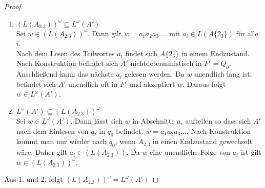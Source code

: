 \documentclass[a4paper]{scrartcl}
\begin{document}
\begin{enumerate}
\begin{proof}
\begin{enumerate}[1.]
                    \item
                    $(L(A_{2.3}))^\omega \subseteq L^\omega(A')$ \\
                    Sei $w \in (L(A_{2.3}))^\omega $.
                    Dann gilt $w = a_1a_2a_3....$ mit $a_i \in L(A\{2_3\})$ für
                    alle $i$. \\
                    Nach dem Lesen des Teilwortes $a_i$ findet sich $A\{2_3\}$
                    in einem Endzustand.
                    Nach Konstruktion befindet sich $A'$ nichtdeterministisch in
                    $F'=Q_0$.
                    Anschließend kann das nächste $a_i$ gelesen werden.
                    Da $w$ unendlich lang ist, befindet sich $A'$ unendlich oft
                    in $F'$ und akzeptiert $w$.
                    Daraus folgt $w \in L^\omega(A')$. 

                    \item $L^{\omega}(A') \subseteq (L(A_{2.3}))^{\omega}$ \\
                    Sei $w \in L^{\omega}(A')$.
                    Dann lässt sich $w$ in Abschnitte $a_i$ aufteilen so dass
                    sich $A'$ nach dem Einlesen von $a_i$ in $q_0$ befindet.
                    $w=a_1 a_2 a_3 ...$.
                    Nach Konstruktion kommt man nur wieder nach $q_0$, wenn
                    $A_{2.3}$ in einen Endzustand gewechselt wäre.
                    Daher gilt $a_i \in (L(A_{2.3}))$.
                    Da $w$ eine unendliche Folge von $a_i$ ist gilt
                    $w \in (L(A_{2.3}))^{\omega}$.
                \end{enumerate}
                Aus 1. und 2. folgt $(L(A_{2.3}))^{\omega} = L^{\omega}(A')$
            \end{proof}
\end{enumerate}
\end{document}
